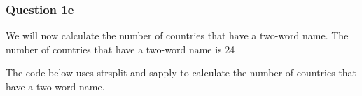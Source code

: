 \documentclass[
]{article}
\newenvironment{Shaded}{\begin{snugshade}}{\end{snugshade}}
\newcommand{\CommentTok}[1]{\textcolor[rgb]{0.56,0.35,0.01}{\textit{#1}}}
\newcommand{\DecValTok}[1]{\textcolor[rgb]{0.00,0.00,0.81}{#1}}
\newcommand{\FunctionTok}[1]{\textcolor[rgb]{0.13,0.29,0.53}{\textbf{#1}}}
\newcommand{\NormalTok}[1]{#1}
\newcommand{\OtherTok}[1]{\textcolor[rgb]{0.56,0.35,0.01}{#1}}
\newcommand{\SpecialCharTok}[1]{\textcolor[rgb]{0.81,0.36,0.00}{\textbf{#1}}}
\newcommand{\StringTok}[1]{\textcolor[rgb]{0.31,0.60,0.02}{#1}}
\begin{document}
\hypertarget{question-1e}{%
\subsubsection{Question 1e}\label{question-1e}}

We will now calculate the number of countries that have a two-word name.
The number of countries that have a two-word name is 24

The code below uses strsplit and sapply to calculate the number of
countries that have a two-word name.

\begin{Shaded}
\end{Shaded}
\end{document}
